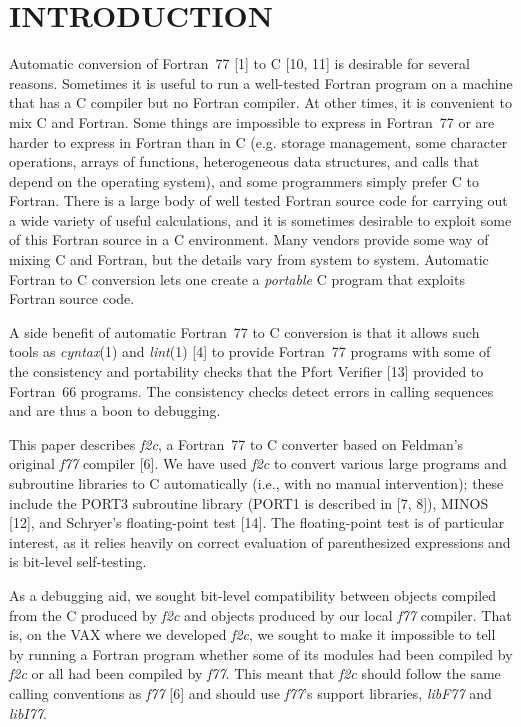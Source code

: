 \documentclass[12pt]{article}
\begin{document}
\section{INTRODUCTION}

Automatic conversion of Fortran~77 [1] to C [10, 11] is desirable for several reasons. Sometimes it is useful to run a well-tested Fortran program on a machine that has a C compiler but no Fortran compiler. At other times, it is convenient to mix C and Fortran. Some things are impossible to express in Fortran~77 or are harder to express in Fortran than in C (e.g. storage management, some character operations, arrays of functions, heterogeneous data structures, and calls that depend on the operating system), and some programmers simply prefer C to Fortran. There is a large body of well tested Fortran source code for carrying out a wide variety of useful calculations, and it is sometimes desirable to exploit some of this Fortran source in a C environment. Many vendors provide some way of mixing C and Fortran, but the details vary from system to system. Automatic Fortran to C conversion lets one create a \emph{portable} C program that exploits Fortran source code.

A side benefit of automatic Fortran~77 to C conversion is that it allows such tools as \emph{cyntax}(1) and \emph{lint}(1) [4] to provide Fortran~77 programs with some of the consistency and portability checks that the Pfort Verifier [13] provided to Fortran~66 programs. The consistency checks detect errors in calling sequences and are thus a boon to debugging.

This paper describes \emph{f2c}, a Fortran~77 to C converter based on Feldman’s original \emph{f77} compiler [6]. We have used \emph{f2c} to convert various large programs and subroutine libraries to C automatically (i.e., with no manual intervention); these include the PORT3 subroutine library (PORT1 is described in [7, 8]), MINOS [12], and Schryer’s floating-point test [14]. The floating-point test is of particular interest, as it relies heavily on correct evaluation of parenthesized expressions and is bit-level self-testing.

As a debugging aid, we sought bit-level compatibility between objects compiled from the C produced by \emph{f2c} and objects produced by our local \emph{f77} compiler. That is, on the VAX where we developed \emph{f2c}, we sought to make it impossible to tell by running a Fortran program whether some of its modules had been compiled by \emph{f2c} or all had been compiled by \emph{f77}. This meant that \emph{f2c} should follow the same calling conventions as \emph{f77} [6] and should use \emph{f77}’s support libraries, \emph{libF77} and \emph{libI77}.
\end{document}

